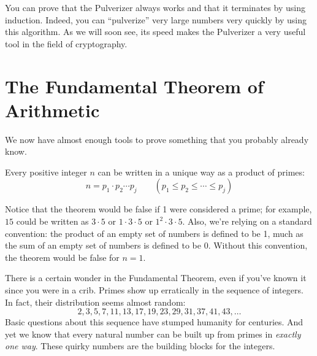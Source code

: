 You can prove that the Pulverizer always works and that it terminates
by using induction.  Indeed, you can ``pulverize'' very large numbers
very quickly by using this algorithm.  As we will soon see, its speed
makes the Pulverizer a very useful tool in the field of
cryptography.

\begin{problems}
\classproblems
{}

\end{problems}

\section{The Fundamental Theorem of Arithmetic}\label{fundamental_theorem_sec}

We now have almost enough tools to prove something that you probably
already know.

\begin{theorem}
Every positive integer $n$ can be written in a unique way as a product
of primes:
\begin{equation*}
    n = p_1 \cdot p_2 \cdots p_j \qquad (p_1 \leq p_2 \leq \cdots \leq p_j)
\end{equation*}
\end{theorem}

Notice that the theorem would be false if 1 were considered a prime;
for example, $15$ could be written as $3 \cdot 5$ or $1 \cdot 3 \cdot
5$ or $1^2 \cdot 3 \cdot 5$.  Also, we're relying on a standard
convention: the product of an empty set of numbers is defined to be 1,
much as the sum of an empty set of numbers is defined to be 0.
Without this convention, the theorem would be false for $n = 1$.

There is a certain wonder in the Fundamental Theorem, even if you've
known it since you were in a crib.  Primes show up erratically in the sequence
of integers.  In fact, their distribution seems almost random:
%
\[
2, 3, 5, 7, 11, 13, 17, 19, 23, 29, 31, 37, 41, 43, \dots
\]
%
Basic questions about this sequence have stumped humanity for
centuries.  And yet we know that every natural number can be built up
from primes in \emph{exactly one way}.  These quirky numbers are the
building blocks for the integers.

